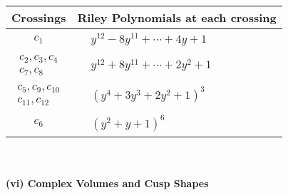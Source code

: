 \documentclass[1p]{elsarticle_modified}
\theoremstyle{definition}
\begin{document}
\begin{tabular}{m{50pt}|m{274pt}}
Crossings & \hspace{64pt}Riley Polynomials at each crossing \\
\hline $$\begin{aligned}c_{1}\end{aligned}$$&$\begin{aligned}
&y^{12}-8 y^{11}+\cdots+4 y+1
\end{aligned}$\\
\hline $$\begin{aligned}c_{2},c_{3},c_{4}\\c_{7},c_{8}\end{aligned}$$&$\begin{aligned}
&y^{12}+8 y^{11}+\cdots+2 y^2+1
\end{aligned}$\\
\hline $$\begin{aligned}c_{5},c_{9},c_{10}\\c_{11},c_{12}\end{aligned}$$&$\begin{aligned}
&(y^4+3 y^3+2 y^2+1)^3
\end{aligned}$\\
\hline $$\begin{aligned}c_{6}\end{aligned}$$&$\begin{aligned}
&(y^2+y+1)^6
\end{aligned}$\\
\hline
\end{tabular}\\~\\
\newpage\flushleft \textbf{(vi) Complex Volumes and Cusp Shapes}
\end{document}
